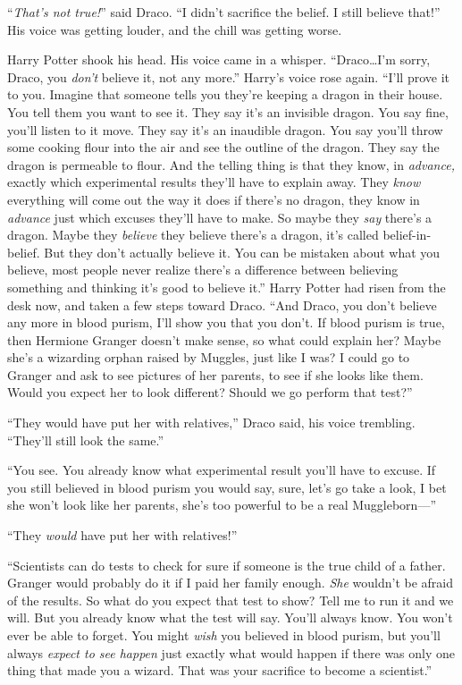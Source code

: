 “\emph{That’s not true!}” said Draco. “I didn’t sacrifice the belief. I still
believe that!” His voice was getting louder, and the chill was getting worse.

Harry Potter shook his head. His voice came in a whisper. “Draco…I’m
sorry, Draco, you \emph{don’t} believe it, not any more.” Harry’s voice rose
again. “I’ll prove it to you. Imagine that someone tells you they’re keeping a
dragon in their house. You tell them you want to see it. They say it’s an
invisible dragon. You say fine, you’ll listen to it move. They say it’s an
inaudible dragon. You say you’ll throw some cooking flour into the air and see
the outline of the dragon. They say the dragon is permeable to flour. And the
telling thing is that they know, in \emph{advance,} exactly which experimental
results they’ll have to explain away. They \emph{know} everything will come out
the way it does if there’s no dragon, they know in \emph{advance} just which
excuses they’ll have to make. So maybe they \emph{say} there’s a dragon. Maybe
they \emph{believe} they believe there’s a dragon, it’s called
belief-in-belief. But they don’t actually believe it. You can be mistaken about
what you believe, most people never realize there’s a difference between
believing something and thinking it’s good to believe it.” Harry Potter had
risen from the desk now, and taken a few steps toward Draco. “And Draco, you
don’t believe any more in blood purism, I’ll show you that you don’t. If blood
purism is true, then Hermione Granger doesn’t make sense, so what could explain
her? Maybe she’s a wizarding orphan raised by Muggles, just like I was? I could
go to Granger and ask to see pictures of her parents, to see if she looks like
them. Would you expect her to look different? Should we go perform that test?”

“They would have put her with relatives,” Draco said, his voice trembling.
“They’ll still look the same.”

“You see. You already know what experimental result you’ll have to excuse. If
you still believed in blood purism you would say, sure, let’s go take a look, I
bet she won’t look like her parents, she’s too powerful to be a real
Muggleborn—”

“They \emph{would} have put her with relatives!”

“Scientists can do tests to check for sure if someone is the true child of a
father. Granger would probably do it if I paid her family enough. \emph{She}
wouldn’t be afraid of the results. So what do you expect that test to show?
Tell me to run it and we will. But you already know what the test will say.
You’ll always know. You won’t ever be able to forget. You might \emph{wish} you
believed in blood purism, but you’ll always \emph{expect to see happen} just
exactly what would happen if there was only one thing that made you a wizard.
That was your sacrifice to become a scientist.”


